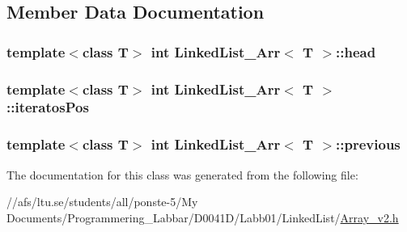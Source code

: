 \subsection{Member Data Documentation}
\hypertarget{class_linked_list___arr_a9a792afdd7f903981f7ed21aa2239dfd}{
\subsubsection[{head}]{\setlength{\rightskip}{0pt plus 5cm}template$<$class T$>$ int {\bf Linked\-List\-\_\-\-Arr}$<$ T $>$\-::head\hspace{0.3cm}{\ttfamily [protected]}}}\label{class_linked_list___arr_a9a792afdd7f903981f7ed21aa2239dfd}
\hypertarget{class_linked_list___arr_af47d4c0cf43f44120bc658d5d1917f53}{
\subsubsection[{iteratos\-Pos}]{\setlength{\rightskip}{0pt plus 5cm}template$<$class T$>$ int {\bf Linked\-List\-\_\-\-Arr}$<$ T $>$\-::iteratos\-Pos\hspace{0.3cm}{\ttfamily [protected]}}}\label{class_linked_list___arr_af47d4c0cf43f44120bc658d5d1917f53}
\hypertarget{class_linked_list___arr_aab0f6d9da0106d51d39048b2f21cf76a}{
\subsubsection[{previous}]{\setlength{\rightskip}{0pt plus 5cm}template$<$class T$>$ int {\bf Linked\-List\-\_\-\-Arr}$<$ T $>$\-::previous\hspace{0.3cm}{\ttfamily [protected]}}}\label{class_linked_list___arr_aab0f6d9da0106d51d39048b2f21cf76a}


The documentation for this class was generated from the following file\-:\begin{DoxyCompactItemize}
\item 
//afs/ltu.\-se/students/all/ponste-\/5/\-My Documents/\-Programmering\-\_\-\-Labbar/\-D0041\-D/\-Labb01/\-Linked\-List/\hyperlink{_array__v2_8h}{Array\-\_\-v2.\-h}\end{DoxyCompactItemize}
